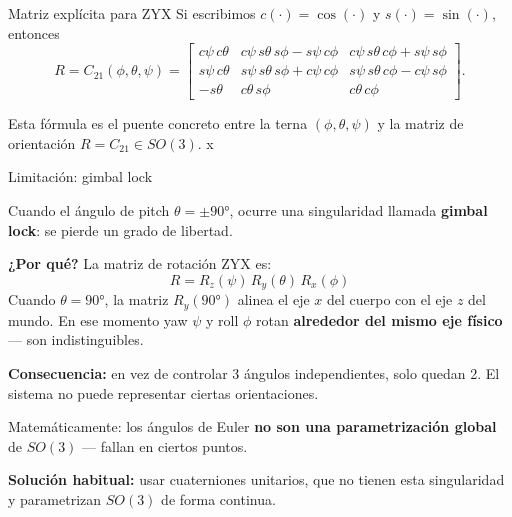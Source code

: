 \documentclass[11pt]{beamer}
\begin{document}

\begin{frame}{Matriz explícita para ZYX}
\small
Si escribimos \(c(\cdot)=\cos(\cdot)\) y \(s(\cdot)=\sin(\cdot)\), entonces
\[
R = C_{21}(\phi,\theta,\psi)=
\begin{bmatrix}
 c\psi\,c\theta & c\psi\,s\theta\,s\phi - s\psi\,c\phi & c\psi\,s\theta\,c\phi + s\psi\,s\phi\\[4pt]
 s\psi\,c\theta & s\psi\,s\theta\,s\phi + c\psi\,c\phi & s\psi\,s\theta\,c\phi - c\psi\,s\phi\\[4pt]
 -s\theta & c\theta\,s\phi & c\theta\,c\phi
\end{bmatrix}.
\]

\medskip
Esta fórmula es el puente concreto entre la terna \((\phi,\theta,\psi)\) y la matriz de orientación \(R = C_{21}\in SO(3)\).
    x
\end{frame}


\begin{frame}{Limitación: gimbal lock}

\small
Cuando el ángulo de pitch \(\theta = \pm 90°\), ocurre una singularidad
llamada \textbf{gimbal lock}: se pierde un grado de libertad.

\medskip
\textbf{¿Por qué?} La matriz de rotación ZYX es:
\[
R = R_z(\psi)\,R_y(\theta)\,R_x(\phi)
\]
Cuando \(\theta = 90°\), la matriz \(R_y(90°)\) alinea el eje \(x\) del
cuerpo con el eje \(z\) del mundo. En ese momento yaw \(\psi\) y
roll \(\phi\) rotan \textbf{alrededor del mismo eje físico} — son
indistinguibles.

\medskip
\textbf{Consecuencia:} en vez de controlar 3 ángulos independientes,
solo quedan 2. El sistema no puede representar ciertas orientaciones.

\medskip
Matemáticamente: los ángulos de Euler \textbf{no son una parametrización
global} de \(SO(3)\) — fallan en ciertos puntos.

\medskip
\textbf{Solución habitual:} usar cuaterniones unitarios, que no tienen
esta singularidad y parametrizan \(SO(3)\) de forma continua.

\end{frame}


\end{document}

